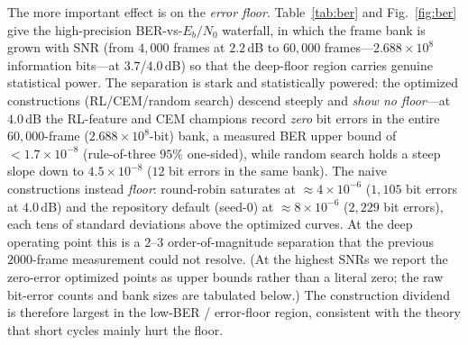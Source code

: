 \documentclass[journal]{IEEEtran}
\begin{document}
The more important effect is on the \emph{error floor}. Table~\ref{tab:ber} and
Fig.~\ref{fig:ber} give the high-precision BER-vs-$E_b/N_0$ waterfall, in which
the frame bank is grown with SNR (from $4{,}000$ frames at $2.2$\,dB to
$60{,}000$ frames---$2.688\times10^{8}$ information bits---at $3.7$/$4.0$\,dB) so
that the deep-floor region carries genuine statistical power. The separation is
stark and statistically powered: the optimized constructions (RL/CEM/random
search) descend steeply and \emph{show no floor}---at $4.0$\,dB the RL-feature
and CEM champions record \emph{zero} bit errors in the entire $60{,}000$-frame
($2.688\times10^{8}$-bit) bank, a measured BER upper bound of
$<1.7\times10^{-8}$ (rule-of-three $95\%$ one-sided), while random search holds a
steep slope down to $4.5\times10^{-8}$ ($12$ bit errors in the same bank).
The naive constructions instead \emph{floor}: round-robin saturates at
$\approx\!4\times10^{-6}$ ($1{,}105$ bit errors at $4.0$\,dB) and the repository
default (seed-0) at $\approx\!8\times10^{-6}$ ($2{,}229$ bit errors), each tens
of standard deviations above the optimized curves. At the deep operating point
this is a $2$--$3$ order-of-magnitude separation that the previous
$2000$-frame measurement could not resolve. (At the highest SNRs we report the
zero-error optimized points as upper bounds rather than a literal zero; the raw
bit-error counts and bank sizes are tabulated below.) The construction dividend
is therefore largest in the low-BER / error-floor region, consistent with the
theory that short cycles mainly hurt the floor.
\end{document}
